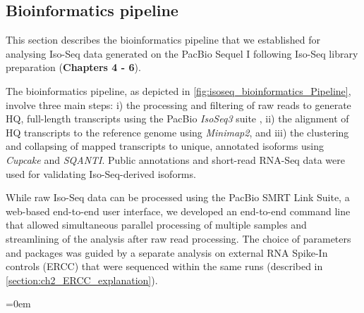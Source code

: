 \clearpage
\subsection{Bioinformatics pipeline} 
\label{section:isoseq_bioinformatics}
This section describes the bioinformatics pipeline that we established for analysing Iso-Seq data generated on the PacBio Sequel I following Iso-Seq library preparation (\textbf{Chapters 4 - 6}). 

The bioinformatics pipeline, as depicted in \cref{fig:isoseq_bioinformatics_Pipeline}, involve three main steps: i) the processing and filtering of raw reads to generate HQ, full-length transcripts using the PacBio \textit{IsoSeq3} suite \cite{Gordon2015}, ii) the alignment of HQ transcripts to the reference genome using \textit{Minimap2}\cite{Li2018}, and iii) the clustering and collapsing of mapped transcripts to unique, annotated isoforms using \textit{Cupcake}\cite{TsengCupcake} and \textit{SQANTI}\cite{Tardaguila2018}. Public annotations and short-read RNA-Seq data were used for validating Iso-Seq-derived isoforms. 

While raw Iso-Seq data can be processed using the PacBio SMRT Link Suite, a web-based end-to-end user interface, we developed an end-to-end command line that allowed simultaneous parallel processing of multiple samples and streamlining of the analysis after raw read processing. The choice of parameters and packages was guided by a separate analysis on external RNA Spike-In controls (ERCC) that were sequenced within the same runs (described in \cref{section:ch2_ERCC_explanation}). 

\begingroup
\parindent=0em
\localtableofcontents 
\endgroup



